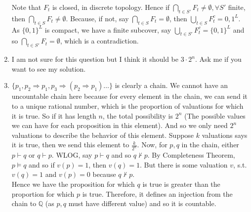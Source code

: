 \begin{enumerate}
    Note that $F_t$ is closed, in discrete topology. Hence if $\bigcap_{t \in S'}F_t \neq \emptyset, \forall S'$ finite, then $\bigcap_{t \in S}F_t \neq \emptyset$. Because, if not, say $\bigcap_{t \in S}F_t =\emptyset$, then $\bigcup_{t \in S}F_t^c ={0,1}^L$. As $\{0,1\}^L$ is compact, we have a finite subcover, say $\bigcup_{t \in S'}F_t^c=\{0,1\}^L$ and so $\bigcap_{t \in S'}F_t = \emptyset$, which is a contradiction.\\
\item I am not sure for this question but I think it should be $3 \cdot 2^n$. Ask me if you want to see my solution.\\
\item $\{p_1, p_2 \Rightarrow p_1, p_3 \Rightarrow (p_2 \Rightarrow p_1) \ldots \}$ is clearly a chain. We cannot have an uncountable chain here because for every element in the chain, we can send it to a unique rational number, which is the proportion of valuations for which it is true. So if it has length $n$, the total possibility is $2^n$ (The possible values we can have for each proposition in this element). And so we only need $2^n$ valuations to describe the behavior of this element. Suppose $k$ valuations says it is true, then we send this element to $\frac{k}{2^n}$. Now, for $p,q$ in the chain, either $p \vdash q$ or $q \vdash p$. WLOG, say $p \vdash q$ and so $q \not \vdash p$. By Completeness Theorem, $p \models q$ and so if $v(p)=1$, then $v(q)=1$. But there is some valuation $v$, s.t. $v(q)=1$ and $v(p)=0$ because $q \not \vdash p$.\\
    Hence we have the proposition for which $q$ is true is greater than the proportion for which $p$ is true. Therefore, it defines an injection from the chain to $\mathbb{Q}$ (as $p,q$ must have different value) and so it is countable.
\end{enumerate}
